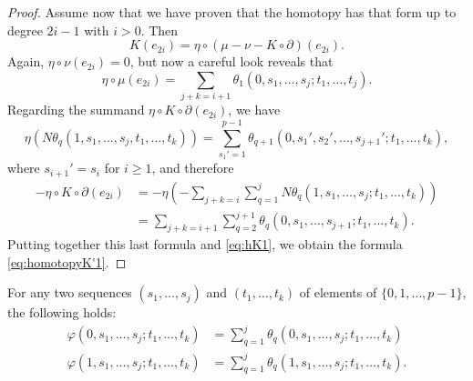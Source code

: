 \begin{proof}
	Assume now that we have proven that the homotopy has that form up to degree $2i-1$ with $i>0$. Then
	\[K(e_{2i}) = \eta\circ (\mu-\nu-K\circ\partial)(e_{2i}).\]
	Again, $\eta\circ\nu(e_{2i}) = 0$, but now a careful look reveals that
	\begin{equation}\label{eq:hK1}\eta\circ\mu(e_{2i}) = \sum_{j+k=i+1}\theta_1(0,s_1,\ldots,s_j;t_1,\ldots,t_j).
	\end{equation}
	Regarding the summand $\eta\circ K\circ \partial(e_{2i})$, we have
	\[\eta(N\theta_q(1,s_1,\ldots,s_j,t_1,\ldots,t_k)) = \sum_{s_1' = 1}^{p-1}\theta_{q+1}(0,s_1',s_2',\ldots,s_{j+1}';t_1,\ldots,t_k),\]
	where $s_{i+1}' = s_i$ for $i\geq 1$, and therefore
	\begin{align*} \label{eq:hK2}
		-\eta\circ K\circ\partial(e_{2i})
		&= -\eta\left(-\sum_{j+k = i}\sum_{q=1}^j N\theta_q(1,s_1,\ldots,s_j;t_1,\ldots,t_k)\right) \\
		&= \sum_{j+k = i+1}\sum_{q=2}^{j+1}\theta_q(0,s_1,\ldots,s_{j+1};t_1,\ldots,t_k).
	\end{align*}
	Putting together this last formula and \eqref{eq:hK1}, we obtain the formula \eqref{eq:homotopyK'1}.
\end{proof}

\begin{lemma}\label{l:homotopyK''}
	For any two sequences $(s_1,\ldots,s_j)$ and $(t_1,\ldots,t_k)$ of elements of $\{0,1,\ldots,p-1\}$, the following holds:
	\begin{align*}
		\varphi(0,s_1,\ldots,s_j;t_1,\ldots,t_k) &= \sum_{q=1}^j \theta_q(0,s_1,\ldots,s_j;t_1,\ldots,t_k) \\
		\varphi(1,s_1,\ldots,s_j;t_1,\ldots,t_k) &= \sum_{q=1}^j \theta_q(1,s_1,\ldots,s_j;t_1,\ldots,t_k).
	\end{align*}
\end{lemma}

